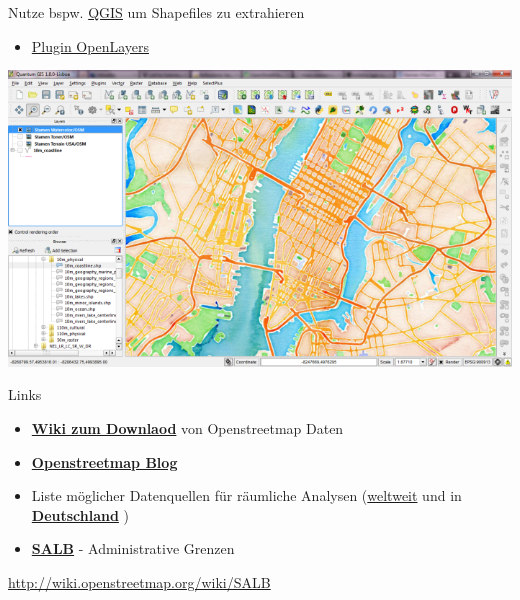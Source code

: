 \documentclass[ignorenonframetext,]{beamer}
\providecommand{\tightlist}{%
  \setlength{\itemsep}{0pt}\setlength{\parskip}{0pt}}
\begin{document}
\begin{frame}{Nutze bspw. \href{http://www.qgis.org/de/site/}{QGIS} um
Shapefiles zu extrahieren}
\protect\hypertarget{nutze-bspw.-qgis-um-shapefiles-zu-extrahieren}{}

\begin{itemize}
\tightlist
\item
  \href{http://www.qgistutorials.com/de/docs/downloading_osm_data.html}{Plugin
  OpenLayers}
\end{itemize}

\includegraphics{figure/stamen_watercolor1.png}

\end{frame}

\begin{frame}{Links}
\protect\hypertarget{links}{}

\begin{itemize}
\item
  \href{http://wiki.openstreetmap.org/wiki/Downloading_data}{\textbf{Wiki
  zum Downlaod}} von Openstreetmap Daten
\item
  \href{http://blog.openstreetmap.de/}{\textbf{Openstreetmap Blog}}
\item
  Liste möglicher Datenquellen für räumliche Analysen
  (\href{http://wiki.openstreetmap.org/wiki/Potential_Datasources}{weltweit}
  und in
  \href{http://wiki.openstreetmap.org/wiki/DE:Potential_Datasources}{\textbf{Deutschland}}
  )
\item
  \href{http://wiki.openstreetmap.org/wiki/SALB}{\textbf{SALB}} -
  Administrative Grenzen
\end{itemize}

\url{http://wiki.openstreetmap.org/wiki/SALB}

\end{frame}
\end{document}
